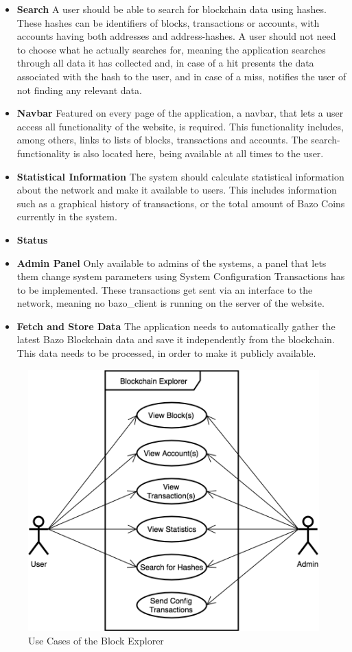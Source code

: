\begin{itemize}
\item \textbf{Search}
A user should be able to search for blockchain data using hashes. These hashes can be identifiers of blocks, transactions or accounts, with accounts having both addresses and address-hashes. A user should not need to choose what he actually searches for, meaning the application searches through all data it has collected and, in case of a hit presents the data associated with the hash to the user, and in case of a miss, notifies the user of not finding any relevant data.
\item \textbf{Navbar}
Featured on every page of the application, a navbar, that lets a user access all functionality of the website, is required. This functionality includes, among others, links to lists of blocks, transactions and accounts. The search-functionality is also located here, being available at all times to the user.
\item \textbf{Statistical Information}
The system should calculate statistical information about the network and make it available to users. This includes information such as a graphical history of transactions, or the total amount of Bazo Coins currently in the system.
\item \textbf{Status}
\item \textbf{Admin Panel}
Only available to admins of the systems, a panel that lets them change system parameters using System Configuration Transactions has to be implemented. These transactions get sent via an interface to the network, meaning no bazo{\_}client is running on the server of the website.
\item \textbf{Fetch and Store Data}
The application needs to automatically gather the latest Bazo Blockchain data and save it independently from the blockchain. This data needs to be processed, in order to make it publicly available. 
\end{itemize}

\begin{figure}
  \includegraphics[width=\linewidth]{usecase1.png}
  \caption{Use Cases of the Block Explorer}
  \label{fig:usecase1}
\end{figure}

